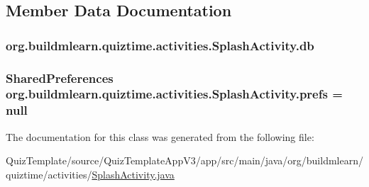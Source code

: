 \subsection{Member Data Documentation}
\subsubsection[{\texorpdfstring{db}{db}}]{ org.\+buildmlearn.\+quiztime.\+activities.\+Splash\+Activity.\+db\hspace{0.3cm}{\ttfamily [private]}}\hypertarget{classorg_1_1buildmlearn_1_1quiztime_1_1activities_1_1SplashActivity_a5d95e5c14ac04921e443f04e2d364809}{}\label{classorg_1_1buildmlearn_1_1quiztime_1_1activities_1_1SplashActivity_a5d95e5c14ac04921e443f04e2d364809}
\subsubsection[{\texorpdfstring{prefs}{prefs}}]{\setlength{\rightskip}{0pt plus 5cm}Shared\+Preferences org.\+buildmlearn.\+quiztime.\+activities.\+Splash\+Activity.\+prefs = null\hspace{0.3cm}{\ttfamily [private]}}\hypertarget{classorg_1_1buildmlearn_1_1quiztime_1_1activities_1_1SplashActivity_a4a67e0c81e083dc77ac92b1c23298c87}{}\label{classorg_1_1buildmlearn_1_1quiztime_1_1activities_1_1SplashActivity_a4a67e0c81e083dc77ac92b1c23298c87}


The documentation for this class was generated from the following file\+:\begin{DoxyCompactItemize}
\item 
Quiz\+Template/source/\+Quiz\+Template\+App\+V3/app/src/main/java/org/buildmlearn/quiztime/activities/\hyperlink{QuizTemplate_2source_2QuizTemplateAppV3_2app_2src_2main_2java_2org_2buildmlearn_2quiztime_2activities_2SplashActivity_8java}{Splash\+Activity.\+java}\end{DoxyCompactItemize}
